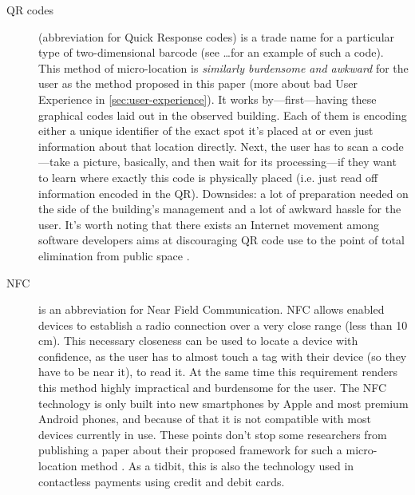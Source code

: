 \begin{description}
	\item[QR codes] (abbreviation for Quick Response codes) is a trade name for a particular type of two-dimensional barcode (see  \ldots for an example of such a code). This method of micro-location is \emph{similarly burdensome and awkward} for the user as the method proposed in this paper (more about bad User Experience in \cref{sec:user-experience}). It works by---first---having these graphical codes laid out in the observed building. Each of them is encoding either a unique identifier of the exact spot it's placed at or even just information about that location directly. Next, the user has to scan a code---take a picture, basically, and then wait for its processing---if they want to learn where exactly this code is physically placed (i.e. just read off information encoded in the QR). Downsides: a lot of preparation needed on the side of the building's management and a lot of awkward hassle for the user. It's worth noting that there exists an Internet movement among software developers aims at discouraging QR code use to the point of total elimination from public space \cite{should-i-use-qr}.
	
	\item[NFC] is an abbreviation for Near Field Communication. NFC allows enabled devices to establish a radio connection over a very close range (less than 10 cm). This necessary closeness can be used to locate a device with confidence, as the user has to almost touch a tag with their device (so they have to be near it), to read it. At the same time this requirement renders this method highly impractical and burdensome for the user. The NFC technology is only built into new smartphones by Apple and most premium Android phones, and because of that it is not compatible with most devices currently in use. These points don't stop some researchers from publishing a paper about their proposed framework for such a micro-location method \cite{nfc-ulocation}. As a tidbit, this is also the technology used in contactless payments using credit and debit cards.
	
\end{description}
